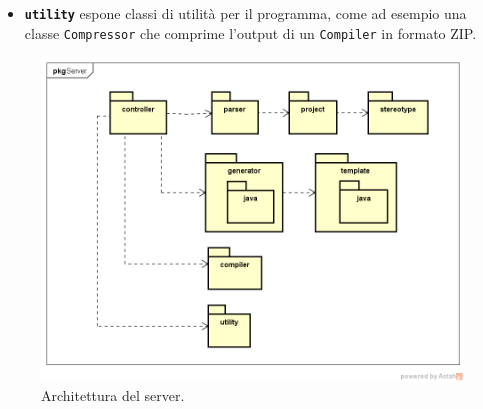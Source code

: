 \begin{itemize}
	\item \textbf{\texttt{utility}} espone classi di utilità per il programma, come ad esempio una classe \texttt{Compressor} che comprime l'output di un \texttt{Compiler} in formato ZIP. %
\end{itemize}

\begin{figure} \label{fig:server_pkg}
	\includegraphics[scale=0.5]{img/server_pkg}
	\caption{Architettura del server.}
\end{figure}



